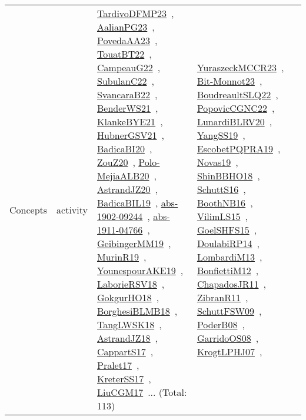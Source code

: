 {\begin{longtable}{lp{3cm}>{\raggedright\arraybackslash}p{6cm}>{\raggedright\arraybackslash}p{6cm}>{\raggedright\arraybackslash}p{8cm}}
Concepts & activity & \href{works/TardivoDFMP23.pdf}{TardivoDFMP23}~\cite{TardivoDFMP23}, \href{works/AalianPG23.pdf}{AalianPG23}~\cite{AalianPG23}, \href{works/PovedaAA23.pdf}{PovedaAA23}~\cite{PovedaAA23}, \href{works/TouatBT22.pdf}{TouatBT22}~\cite{TouatBT22}, \href{works/CampeauG22.pdf}{CampeauG22}~\cite{CampeauG22}, \href{works/SubulanC22.pdf}{SubulanC22}~\cite{SubulanC22}, \href{works/SvancaraB22.pdf}{SvancaraB22}~\cite{SvancaraB22}, \href{works/BenderWS21.pdf}{BenderWS21}~\cite{BenderWS21}, \href{works/KlankeBYE21.pdf}{KlankeBYE21}~\cite{KlankeBYE21}, \href{works/HubnerGSV21.pdf}{HubnerGSV21}~\cite{HubnerGSV21}, \href{works/BadicaBI20.pdf}{BadicaBI20}~\cite{BadicaBI20}, \href{works/ZouZ20.pdf}{ZouZ20}~\cite{ZouZ20}, \href{works/Polo-MejiaALB20.pdf}{Polo-MejiaALB20}~\cite{Polo-MejiaALB20}, \href{works/AstrandJZ20.pdf}{AstrandJZ20}~\cite{AstrandJZ20}, \href{works/BadicaBIL19.pdf}{BadicaBIL19}~\cite{BadicaBIL19}, \href{works/abs-1902-09244.pdf}{abs-1902-09244}~\cite{abs-1902-09244}, \href{works/abs-1911-04766.pdf}{abs-1911-04766}~\cite{abs-1911-04766}, \href{works/GeibingerMM19.pdf}{GeibingerMM19}~\cite{GeibingerMM19}, \href{works/MurinR19.pdf}{MurinR19}~\cite{MurinR19}, \href{works/YounespourAKE19.pdf}{YounespourAKE19}~\cite{YounespourAKE19}, \href{works/LaborieRSV18.pdf}{LaborieRSV18}~\cite{LaborieRSV18}, \href{works/GokgurHO18.pdf}{GokgurHO18}~\cite{GokgurHO18}, \href{works/BorghesiBLMB18.pdf}{BorghesiBLMB18}~\cite{BorghesiBLMB18}, \href{works/TangLWSK18.pdf}{TangLWSK18}~\cite{TangLWSK18}, \href{works/AstrandJZ18.pdf}{AstrandJZ18}~\cite{AstrandJZ18}, \href{works/CappartS17.pdf}{CappartS17}~\cite{CappartS17}, \href{works/Pralet17.pdf}{Pralet17}~\cite{Pralet17}, \href{works/KreterSS17.pdf}{KreterSS17}~\cite{KreterSS17}, \href{works/LiuCGM17.pdf}{LiuCGM17}~\cite{LiuCGM17}... (Total: 113) & \href{works/YuraszeckMCCR23.pdf}{YuraszeckMCCR23}~\cite{YuraszeckMCCR23}, \href{works/Bit-Monnot23.pdf}{Bit-Monnot23}~\cite{Bit-Monnot23}, \href{works/BoudreaultSLQ22.pdf}{BoudreaultSLQ22}~\cite{BoudreaultSLQ22}, \href{works/PopovicCGNC22.pdf}{PopovicCGNC22}~\cite{PopovicCGNC22}, \href{works/LunardiBLRV20.pdf}{LunardiBLRV20}~\cite{LunardiBLRV20}, \href{works/YangSS19.pdf}{YangSS19}~\cite{YangSS19}, \href{works/EscobetPQPRA19.pdf}{EscobetPQPRA19}~\cite{EscobetPQPRA19}, \href{works/Novas19.pdf}{Novas19}~\cite{Novas19}, \href{works/ShinBBHO18.pdf}{ShinBBHO18}~\cite{ShinBBHO18}, \href{works/SchuttS16.pdf}{SchuttS16}~\cite{SchuttS16}, \href{works/BoothNB16.pdf}{BoothNB16}~\cite{BoothNB16}, \href{works/VilimLS15.pdf}{VilimLS15}~\cite{VilimLS15}, \href{works/GoelSHFS15.pdf}{GoelSHFS15}~\cite{GoelSHFS15}, \href{works/DoulabiRP14.pdf}{DoulabiRP14}~\cite{DoulabiRP14}, \href{works/LombardiM13.pdf}{LombardiM13}~\cite{LombardiM13}, \href{works/BonfiettiM12.pdf}{BonfiettiM12}~\cite{BonfiettiM12}, \href{works/ChapadosJR11.pdf}{ChapadosJR11}~\cite{ChapadosJR11}, \href{works/ZibranR11.pdf}{ZibranR11}~\cite{ZibranR11}, \href{works/SchuttFSW09.pdf}{SchuttFSW09}~\cite{SchuttFSW09}, \href{works/PoderB08.pdf}{PoderB08}~\cite{PoderB08}, \href{works/GarridoOS08.pdf}{GarridoOS08}~\cite{GarridoOS08}, \href{works/KrogtLPHJ07.pdf}{KrogtLPHJ07}~\cite{KrogtLPHJ07}, 
\end{longtable}}
